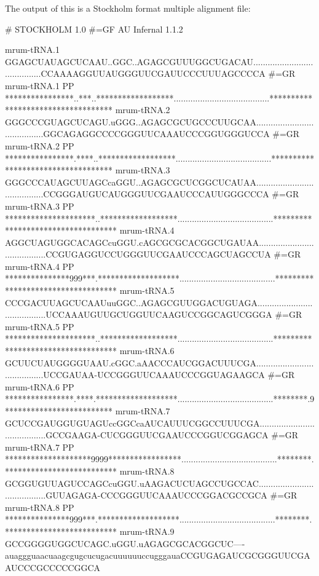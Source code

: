 
The output of this is a Stockholm format multiple alignment file:

\begin{tinysreoutput}
# STOCKHOLM 1.0
#=GF AU Infernal 1.1.2

mrum-tRNA.1          GGAGCUAUAGCUCAAU..GGC..AGAGCGUUUGGCUGACAU........................................CCAAAAGGUUAUGGGUUCGAUUCCCUUUAGCCCCA
#=GR mrum-tRNA.1  PP ****************..***..******************........................................***********************************
mrum-tRNA.2          GGGCCCGUAGCUCAGU.uGGG..AGAGCGCUGCCCUUGCAA........................................GGCAGAGGCCCCGGGUUCAAAUCCCGGUGGGUCCA
#=GR mrum-tRNA.2  PP ****************.****..******************........................................***********************************
mrum-tRNA.3          GGGCCCAUAGCUUAGCcaGGU..AGAGCGCUCGGCUCAUAA........................................CCGGGAUGUCAUGGGUUCGAAUCCCAUUGGGCCCA
#=GR mrum-tRNA.3  PP *********************..******************........................................***********************************
mrum-tRNA.4          AGGCUAGUGGCACAGCcuGGU.cAGCGCGCACGGCUGAUAA........................................CCGUGAGGUCCUGGGUUCGAAUCCCAGCUAGCCUA
#=GR mrum-tRNA.4  PP ***************999***.*******************........................................***********************************
mrum-tRNA.5          CCCGACUUAGCUCAAUuuGGC..AGAGCGUUGGACUGUAGA........................................UCCAAAUGUUGCUGGUUCAAGUCCGGCAGUCGGGA
#=GR mrum-tRNA.5  PP *********************..******************........................................***********************************
mrum-tRNA.6          GCUUCUAUGGGGUAAU.cGGC.aAACCCAUCGGACUUUCGA........................................UCCGAUAA-UCCGGGUUCAAAUCCCGGUAGAAGCA
#=GR mrum-tRNA.6  PP ****************.****.*******************........................................********.9*************************
mrum-tRNA.7          GCUCCGAUGGUGUAGUccGGCcaAUCAUUUCGGCCUUUCGA........................................GCCGAAGA-CUCGGGUUCGAAUCCCGGUCGGAGCA
#=GR mrum-tRNA.7  PP ********************9999*****************........................................********.**************************
mrum-tRNA.8          GCGGUGUUAGUCCAGCcuGGU.uAAGACUCUAGCCUGCCAC........................................GUUAGAGA-CCCGGGUUCAAAUCCCGGACGCCGCA
#=GR mrum-tRNA.8  PP ***************999***.*******************........................................********.**************************
mrum-tRNA.9          GCCGGGGUGGCUCAGC.uGGU.uAGAGCGCACGGCUC----auaggguaacuaagcgugcucugacuuuuuuccugggauaCCGUGAGAUCGCGGGUUCGAAUCCCGCCCCCGGCA

\end{tinysreoutput}
